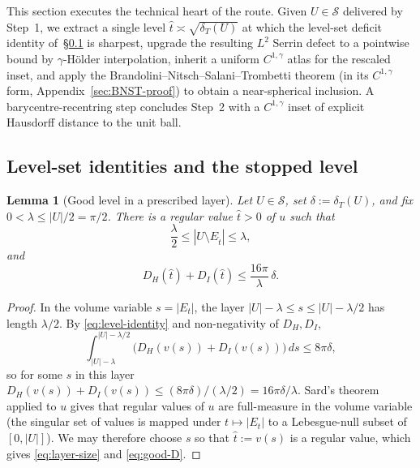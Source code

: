 \documentclass[11pt]{amsart}
\newtheorem{lemma}[theorem]{Lemma}
\newcommand{\dT}{\delta_T}
\newcommand{\Sclass}{\mathcal S}
\begin{document}
This section executes the technical heart of the route.  Given
$U\in\Sclass$ delivered by Step~1, we extract a single level
$\hat t\asymp\sqrt{\dT(U)}$ at which the level-set deficit identity
of~\S\ref{sec:level-id} is sharpest, upgrade the resulting $L^2$
Serrin defect to a pointwise bound by $\gamma$-Hölder interpolation,
inherit a uniform $C^{1,\gamma}$ atlas for the rescaled inset, and
apply the Brandolini--Nitsch--Salani--Trombetti theorem (in its
$C^{1,\gamma}$ form, Appendix~\ref{sec:BNST-proof}) to obtain a
near-spherical inclusion.  A barycentre-recentring step concludes
Step~2 with a $C^{1,\gamma}$ inset of explicit Hausdorff distance to
the unit ball.

\subsection{Level-set identities and the stopped level}\label{sec:level-id}

\begin{lemma}[Good level in a prescribed layer]\label{lem:good-level}
Let \(U\in\Sclass\), set \(\delta:=\dT(U)\), and fix
\(0<\lambda\le|U|/2=\pi/2\).  There is a regular value \(\hat t>0\)
of \(u\) such that
\begin{equation}\label{eq:layer-size}
   \frac{\lambda}2\le |U\setminus E_{\hat t}|\le \lambda,
\end{equation}
and
\begin{equation}\label{eq:good-D}
   D_H(\hat t)+D_I(\hat t)
      \le \frac{16\pi}{\lambda}\,\delta.
\end{equation}
\end{lemma}

\begin{proof}
In the volume variable \(s=|E_t|\), the layer
\(|U|-\lambda\le s\le|U|-\lambda/2\) has length \(\lambda/2\).  By
\eqref{eq:level-identity} and non-negativity of \(D_H,D_I\),
\[
   \int_{|U|-\lambda}^{|U|-\lambda/2}
      \bigl(D_H(v(s))+D_I(v(s))\bigr)\,ds
   \le 8\pi\delta,
\]
so for some \(s\) in this layer
\(D_H(v(s))+D_I(v(s))\le (8\pi\delta)/(\lambda/2)=16\pi\delta/\lambda\).
Sard's theorem applied to \(u\) gives that regular values of \(u\) are
full-measure in the volume variable (the singular set of values is
mapped under \(t\mapsto |E_t|\) to a Lebesgue-null subset of
\([0,|U|]\)).  We may therefore choose \(s\) so that \(\hat t:=v(s)\) is
a regular value, which gives \eqref{eq:layer-size} and
\eqref{eq:good-D}.
\end{proof}
\end{document}

